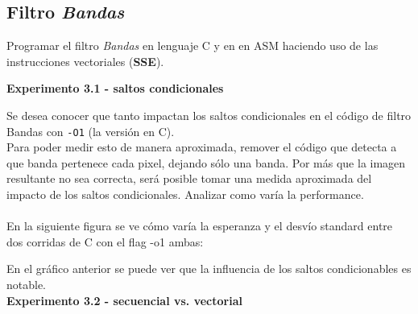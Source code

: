\newpage

\subsection{Filtro \textit{Bandas}}

Programar el filtro \textit{Bandas} en lenguaje C y en en ASM haciendo uso de 
las instrucciones vectoriales (\textbf{SSE}).

\vspace*{0.3cm} \noindent
\textbf{Experimento 3.1 - saltos condicionales}

Se desea conocer que tanto impactan los saltos condicionales en el código 
de filtro Bandas con \verb|-O1| (la versión en C).\\
Para poder medir esto de manera aproximada, remover el código
que detecta a que banda pertenece cada pixel, dejando
sólo una banda.
Por más que la imagen resultante no sea correcta, será posible tomar una
medida aproximada del impacto de los saltos condicionales.
Analizar como varía la performance. \\
\\
En la siguiente figura se ve c\'omo var\'ia la esperanza y el desv\'io standard entre dos corridas de C con el flag -o1 ambas:
\newpage
\begin{figure}
  \begin{center}
  \end{center}
\end{figure}
\newpage
En el gr\'afico anterior se puede ver que la influencia de los saltos condicionables es notable. \\
\vspace*{0.3cm} \noindent
\textbf{Experimento 3.2 - secuencial vs. vectorial}


